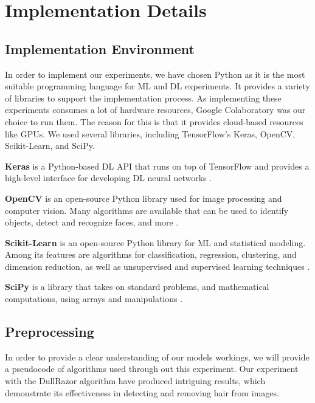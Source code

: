 \documentclass[12pt]{diazessay}
\begin{document}
       
    \newpage
    \section{Implementation Details}
    \subsection{Implementation Environment}
    \-\hspace{0.7cm}In order to implement our experiments, we have chosen Python as it is the most suitable programming language for ML and DL experiments. It provides a variety of libraries to support the implementation process. As implementing these experiments consumes a lot of hardware resources, Google Colaboratory was our choice to run them. The reason for this is that it provides cloud-based resources like GPUs. We used several libraries, including TensorFlow's Keras, OpenCV, Scikit-Learn, and SciPy.

    \textbf{Keras} is a Python-based DL API that runs on top of TensorFlow and provides a high-level interface for developing DL neural networks \cite{manaswi2018understanding}.

    \textbf{OpenCV} is an open-source Python library used for image processing and computer vision. Many algorithms are available that can be used to identify objects, detect and recognize faces, and more \cite{bradski2008learning}.

    \textbf{Scikit-Learn} is an open-source Python library for ML and statistical modeling. Among its features are algorithms for classification, regression, clustering, and dimension reduction, as well as unsupervised and supervised learning techniques \cite{pedregosa2011scikit}.

    \textbf{SciPy} is a library that takes on standard problems, and mathematical computations, using arrays and manipulations \cite{bressert2012scipy}.

    \subsection{Preprocessing}

    \-\hspace{0.7cm}In order to provide a clear understanding of our models workings, we will provide a pseudocode of algorithms used through out this experiment.
    Our experiment with the DullRazor algorithm have produced intriguing results, which demonstrate its effectiveness in detecting and removing hair from images. \\
    
\end{document}
